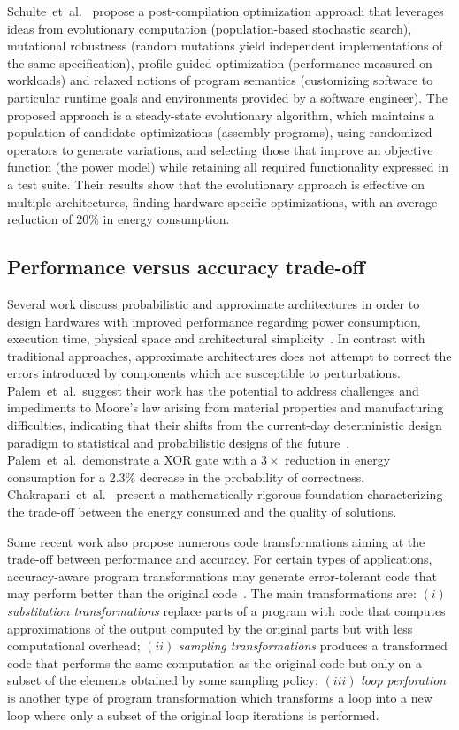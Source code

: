 \documentclass[a4paper,12pt]{article}
\newcommand{\etal}{et~al.}
\begin{document}
Schulte~\etal~\cite{schulte14a} propose a post-compilation optimization
approach that leverages ideas from evolutionary computation (population-based
stochastic search), mutational robustness (random mutations yield independent
implementations of the same specification), profile-guided optimization
(performance measured on workloads) and relaxed notions of program semantics
(customizing software to particular runtime goals and environments provided by
a software engineer).  The proposed approach is a steady-state evolutionary
algorithm, which maintains a population of candidate optimizations (assembly
programs), using randomized operators to generate variations, and selecting
those that improve an objective function (the power model) while retaining all
required functionality expressed in a test suite.  Their results show that the
evolutionary approach is effective on multiple architectures, finding
hardware-specific optimizations, with an average reduction of 20\% in energy
consumption.

\subsection{Performance versus accuracy trade-off}
\label{subsec:perfvsacc}

Several work discuss probabilistic and approximate architectures in order to
design hardwares with improved performance regarding power consumption,
execution time, physical space and architectural
simplicity~\cite{palem09,palem12,lingamneni12,kirsch12}.  In contrast with
traditional approaches, approximate architectures does not attempt to correct
the errors introduced by components which are susceptible to perturbations.
Palem~\etal~suggest their work has the potential to address challenges and
impediments to Moore's law arising from material properties and manufacturing
difficulties, indicating that their shifts from the current-day deterministic
design paradigm to statistical and probabilistic designs of the
future~\cite{palem09,palem12}.  Palem~\etal~demonstrate a XOR gate with a
$3\times$ reduction in energy consumption for a 2.3\% decrease in the
probability of correctness.  Chakrapani~\etal~\cite{chakrapani08} present a
mathematically rigorous foundation characterizing the trade-off between the
energy consumed and the quality of solutions.

Some recent work also propose numerous code transformations aiming at the
trade-off between performance and accuracy.  For certain types of applications,
accuracy-aware program transformations may generate error-tolerant code that
may perform better than the original code~\cite{zhu12}.  The main
transformations are: $(i)$ {\em substitution transformations} replace parts of
a program with code that computes approximations of the output computed by the
original parts but with less computational overhead; $(ii)$ {\em sampling
transformations} produces a transformed code that performs the same computation
as the original code but only on a subset of the elements obtained by some
sampling policy; $(iii)$ {\em loop perforation} is another type of program
transformation which transforms a loop into a new loop where only a subset of
the original loop iterations is performed.
\end{document}
